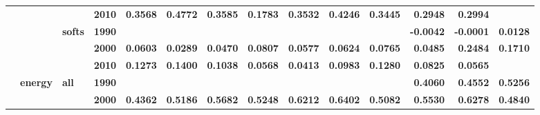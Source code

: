 \documentclass[
  authoryear,
  preprint,
  3p]{elsarticle}
\begin{document}
\begin{landscape}
\begin{longtable}[t]{>{}l>{}l>{}l>{}l>{}r>{}r>{}r>{}r>{}r>{}r>{}r>{}r>{}r>{}r}
\textbf{} & \textbf{} & \textbf{} & \textbf{2010} & \textcolor[HTML]{4285f4}{\textbf{0.3568}} & \textcolor[HTML]{4285f4}{\textbf{0.4772}} & \textcolor[HTML]{4285f4}{\textbf{0.3585}} & \textcolor[HTML]{4285f4}{\textbf{0.1783}} & \textcolor[HTML]{4285f4}{\textbf{0.3532}} & \textcolor[HTML]{4285f4}{\textbf{0.4246}} & \textcolor[HTML]{4285f4}{\textbf{0.3445}} & \textcolor[HTML]{4285f4}{\textbf{0.2948}} & \textcolor[HTML]{4285f4}{\textbf{0.2994}} & \textcolor[HTML]{4285f4}{\textbf{}}\\
\addlinespace
\textbf{} & \textbf{} & \textbf{softs} & \textbf{1990} & \textcolor[HTML]{4285f4}{\textbf{}} & \textcolor[HTML]{4285f4}{\textbf{}} & \textcolor[HTML]{4285f4}{\textbf{}} & \textcolor[HTML]{4285f4}{\textbf{}} & \textcolor[HTML]{4285f4}{\textbf{}} & \textcolor[HTML]{4285f4}{\textbf{}} & \textcolor[HTML]{4285f4}{\textbf{}} & \textcolor[HTML]{4285f4}{\textbf{-0.0042}} & \textcolor[HTML]{4285f4}{\textbf{-0.0001}} & \textcolor[HTML]{4285f4}{\textbf{0.0128}}\\
\textbf{} & \textbf{} & \textbf{} & \textbf{2000} & \textcolor[HTML]{4285f4}{\textbf{0.0603}} & \textcolor[HTML]{4285f4}{\textbf{0.0289}} & \textcolor[HTML]{4285f4}{\textbf{0.0470}} & \textcolor[HTML]{4285f4}{\textbf{0.0807}} & \textcolor[HTML]{4285f4}{\textbf{0.0577}} & \textcolor[HTML]{4285f4}{\textbf{0.0624}} & \textcolor[HTML]{4285f4}{\textbf{0.0765}} & \textcolor[HTML]{4285f4}{\textbf{0.0485}} & \textcolor[HTML]{4285f4}{\textbf{0.2484}} & \textcolor[HTML]{4285f4}{\textbf{0.1710}}\\
\textbf{} & \textbf{} & \textbf{} & \textbf{2010} & \textcolor[HTML]{4285f4}{\textbf{0.1273}} & \textcolor[HTML]{4285f4}{\textbf{0.1400}} & \textcolor[HTML]{4285f4}{\textbf{0.1038}} & \textcolor[HTML]{4285f4}{\textbf{0.0568}} & \textcolor[HTML]{4285f4}{\textbf{0.0413}} & \textcolor[HTML]{4285f4}{\textbf{0.0983}} & \textcolor[HTML]{4285f4}{\textbf{0.1280}} & \textcolor[HTML]{4285f4}{\textbf{0.0825}} & \textcolor[HTML]{4285f4}{\textbf{0.0565}} & \textcolor[HTML]{4285f4}{\textbf{}}\\
\textbf{} & \textbf{energy} & \textbf{all} & \textbf{1990} & \textcolor[HTML]{4285f4}{\textbf{}} & \textcolor[HTML]{4285f4}{\textbf{}} & \textcolor[HTML]{4285f4}{\textbf{}} & \textcolor[HTML]{4285f4}{\textbf{}} & \textcolor[HTML]{4285f4}{\textbf{}} & \textcolor[HTML]{4285f4}{\textbf{}} & \textcolor[HTML]{4285f4}{\textbf{}} & \textcolor[HTML]{4285f4}{\textbf{0.4060}} & \textcolor[HTML]{4285f4}{\textbf{0.4552}} & \textcolor[HTML]{4285f4}{\textbf{0.5256}}\\
\textbf{} & \textbf{} & \textbf{} & \textbf{2000} & \textcolor[HTML]{4285f4}{\textbf{0.4362}} & \textcolor[HTML]{4285f4}{\textbf{0.5186}} & \textcolor[HTML]{4285f4}{\textbf{0.5682}} & \textcolor[HTML]{4285f4}{\textbf{0.5248}} & \textcolor[HTML]{4285f4}{\textbf{0.6212}} & \textcolor[HTML]{4285f4}{\textbf{0.6402}} & \textcolor[HTML]{4285f4}{\textbf{0.5082}} & \textcolor[HTML]{4285f4}{\textbf{0.5530}} & \textcolor[HTML]{4285f4}{\textbf{0.6278}} & \textcolor[HTML]{4285f4}{\textbf{0.4840}}\\

\end{longtable}
\end{landscape}
\end{document}
